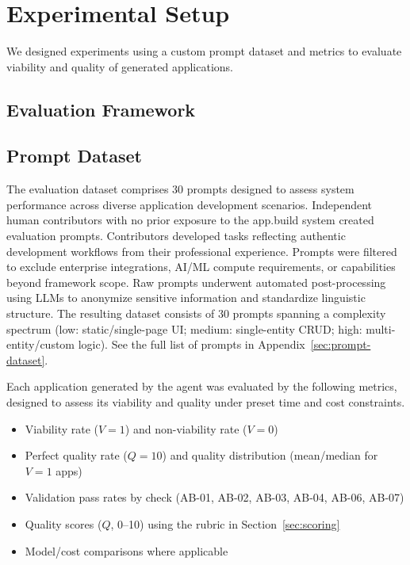 \documentclass[conference]{IEEEtran}
\begin{document}
\section{Experimental Setup}
\label{sec:experimental-setup}

We designed experiments using a custom prompt dataset and metrics to evaluate viability and quality of generated applications.

\subsection{Evaluation Framework}

\subsection{Prompt Dataset}
\label{sec:prompt-dataset-desc}

The evaluation dataset comprises 30 prompts designed to assess system performance across diverse application development scenarios. Independent human contributors with no prior exposure to the app.build system created evaluation prompts. Contributors developed tasks reflecting authentic development workflows from their professional experience. Prompts were filtered to exclude enterprise integrations, AI/ML compute requirements, or capabilities beyond framework scope. Raw prompts underwent automated post-processing using LLMs to anonymize sensitive information and standardize linguistic structure.
The resulting dataset consists of 30 prompts spanning a complexity spectrum (low: static/single-page UI; medium: single-entity CRUD; high: multi-entity/custom logic).
See the full list of prompts in Appendix~\ref{sec:prompt-dataset}.

Each application generated by the agent was evaluated by the following metrics, designed to assess its viability and quality under preset time and cost constraints.

\begin{itemize}
\item Viability rate ($V=1$) and non-viability rate ($V=0$)
\item Perfect quality rate ($Q=10$) and quality distribution (mean/median for $V=1$ apps)
\item Validation pass rates by check (AB-01, AB-02, AB-03, AB-04, AB-06, AB-07)
\item Quality scores ($Q$, 0--10) using the rubric in Section~\ref{sec:scoring}
\item Model/cost comparisons where applicable
\end{itemize}
\end{document}
